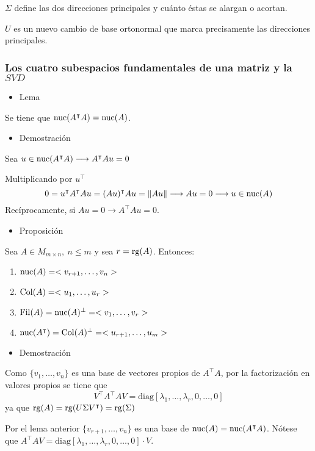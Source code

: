 $\Sigma$ define las dos direcciones principales y cuánto éstas se alargan o acortan.

$U$ es un nuevo cambio de base ortonormal que marca precisamente las direcciones principales.
\subsubsection{Los cuatro subespacios fundamentales de una matriz y la $SVD$}
\begin{itemize}[label=\color{red}\textbullet, leftmargin=*]
	\item \color{lightblue}Lema
\end{itemize}
Se tiene que $\operatorname{\mathrm{nuc}}(A^\intercal A)=\operatorname{\mathrm{nuc}}(A)$.
\begin{itemize}[label=\color{red}\textbullet, leftmargin=*]
	\item \color{lightblue}Demostración
\end{itemize}
Sea $u\in\operatorname{\mathrm{nuc}}(A^\intercal A)\longrightarrow A^\intercal Au=0$

Multiplicando por $u^\intercal$ \[ 0=u^\intercal A^\intercal Au=(Au)^\intercal Au=\|Au\|\longrightarrow Au=0\longrightarrow u\in\operatorname{\mathrm{nuc}}(A) \]
Recíprocamente, si $Au=0\longrightarrow A^\intercal Au=0$.
\begin{itemize}[label=\color{red}\textbullet, leftmargin=*]
	\item \color{lightblue}Proposición
\end{itemize}
Sea $A\in M_{m\times n}, \:n\le m$ y sea $r=\operatorname{\mathrm{rg}}(A)$. Entonces:
\begin{enumerate}[label=\color{lightblue}\arabic*)]
	\item $\operatorname{\mathrm{nuc}}(A)=<v_{r+1},\dots,v_n>$
	\item $\operatorname{\mathrm{Col}}(A)=<u_1,\dots,u_r>$
	\item $\operatorname{\mathrm{Fil}}(A)=\operatorname{\mathrm{nuc}}(A)^\perp=<v_1,\dots,v_r>$
	\item $\operatorname{\mathrm{nuc}}(A^\intercal)=\operatorname{\mathrm{Col}}(A)^\perp=<u_{r+1},\dots,u_m>$
\end{enumerate}
\begin{itemize}[label=\color{red}\textbullet, leftmargin=*]
	\item \color{lightblue}Demostración
\end{itemize}
Como $\{v_1,\dots,v_n\}$ es una base de vectores propios de $A^\intercal A$, por la factorización en valores propios se tiene que \[ V^\intercal A^\intercal AV=\mathrm{diag}[\lambda_1,\dots,\lambda_r,0,\dots,0] \]ya que $\operatorname{\mathrm{rg}}(A)=\operatorname{\mathrm{rg}}(U\Sigma V^\intercal)=\operatorname{\mathrm{rg}}(\Sigma)$

Por el lema anterior $\{v_{r+1},\dots,v_n\}$ es una base de $\operatorname{\mathrm{nuc}}(A)=\operatorname{\mathrm{nuc}}(A^\intercal A)$. Nótese que $A^\intercal AV=\mathrm{diag}[\lambda_1,\dots,\lambda_r,0,\dots,0]\cdot V$.

